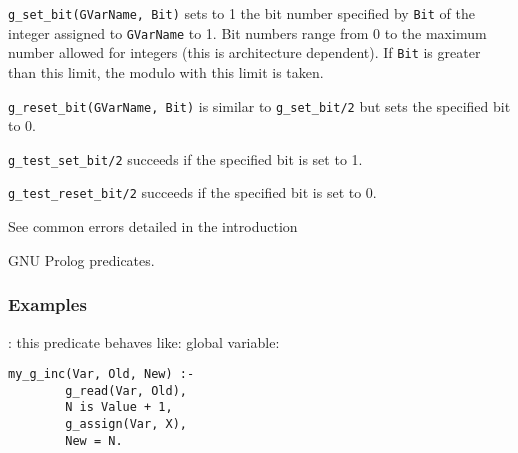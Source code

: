 \Description

\texttt{g\_set\_bit(GVarName, Bit)} sets to 1 the bit number specified by
\texttt{Bit} of the integer assigned to \texttt{GVarName} to 1. Bit numbers
range from 0 to the maximum number allowed for integers (this is architecture dependent). If \texttt{Bit} is greater than this limit,
the modulo with this limit is taken.

\texttt{g\_reset\_bit(GVarName, Bit)} is similar to \texttt{g\_set\_bit/2} but
sets the specified bit to 0.

\texttt{g\_test\_set\_bit/2} succeeds if the specified bit is set to 1.

\texttt{g\_test\_reset\_bit/2} succeeds if the specified bit is set to 0.

\Errors

See common errors detailed in the introduction 

\begin{PlErrorsNoTitle}






\end{PlErrorsNoTitle}

\Portability

GNU Prolog predicates.

\subsubsection{Examples}
\label{Examples}

: this predicate behaves like:
global variable:

\begin{Indentation}
\begin{verbatim}
my_g_inc(Var, Old, New) :-
        g_read(Var, Old),
        N is Value + 1,
        g_assign(Var, X),
        New = N.
\end{verbatim}
\end{Indentation}

